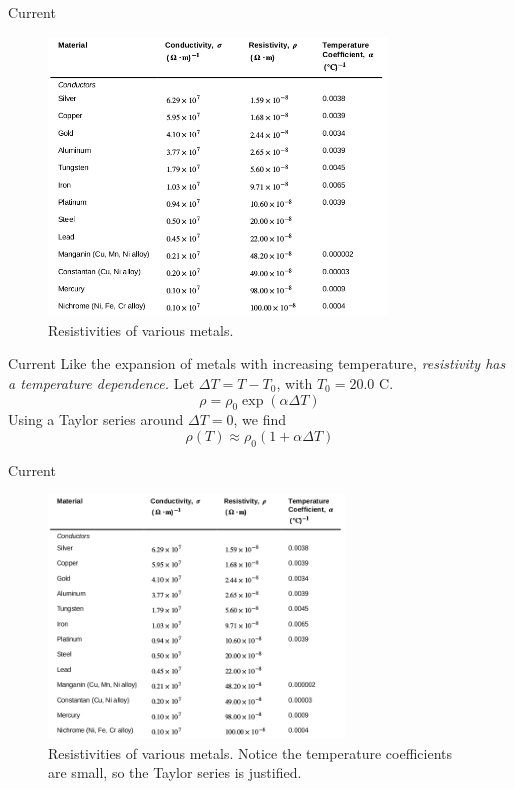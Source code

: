 \documentclass{beamer}
\begin{document}
\begin{frame}{Current}
\begin{figure}
\centering
\includegraphics[width=0.8\textwidth]{figures/resist.png}
\caption{\label{fig:resist} Resistivities of various metals.}
\end{figure}
\end{frame}

\begin{frame}{Current}
Like the expansion of metals with increasing temperature, \textit{resistivity has a temperature dependence.}  Let $\Delta T = T - T_0$, with $T_0 = 20.0$ C.
\begin{equation}
\rho = \rho_0 \exp \left( \alpha \Delta T \right)
\end{equation}
Using a Taylor series around $\Delta T = 0$, we find
\begin{equation}
\rho(T) \approx \rho_0 \left(1 + \alpha \Delta T \right)
\end{equation}
\end{frame}

\begin{frame}{Current}
\begin{figure}
\centering
\includegraphics[width=0.7\textwidth]{figures/resist.png}
\caption{\label{fig:resist2} Resistivities of various metals.  Notice the temperature coefficients are small, so the Taylor series is justified.}
\end{figure}
\end{frame}
\end{document}
